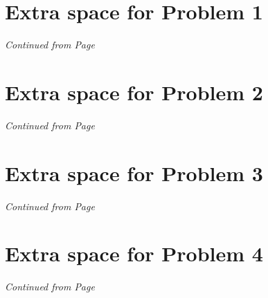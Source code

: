 \documentclass[11pt]{article}
\begin{document}
\newpage

% 
% 
% 
% 
% 
% 
 
 \section*{Extra space for Problem 1}
 \emph{Continued from Page \pageref{pg:end-of-p1}}
 

 \label{pg:p1-continuation}
 
 
 
 \newpage
 
 
 \section*{Extra space for Problem 2}
 \emph{Continued from Page \pageref{pg:end-of-p2}}
 
 
 \label{pg:p2-continuation}
 \newpage
 
 \section*{Extra space for Problem 3}
 \emph{Continued from Page \pageref{pg:end-of-p3}}
 
 \label{pg:p3-continuation}

\newpage
 
 \section*{Extra space for Problem 4}
 \emph{Continued from Page \pageref{pg:end-of-p4}}
 
\end{document}
